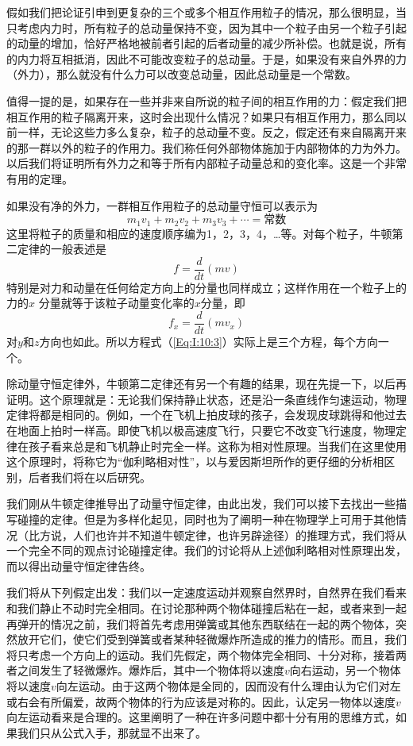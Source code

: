 假如我们把论证引申到更复杂的三个或多个相互作用粒子的情况，那么很明显，当只考虑内力时，所有粒子的总动量保持不变，因为其中一个粒子由另一个粒子引起的动量的增加，恰好严格地被前者引起的后者动量的减少所补偿。也就是说，所有的内力将互相抵消，因此不可能改变粒子的总动量。于是，如果没有来自外界的力（外力），那么就没有什么力可以改变总动量，因此总动量是一个常数。

值得一提的是，如果存在一些并非来自所说的粒子间的相互作用的力：假定我们把相互作用的粒子隔离开来，这时会出现什么情况？如果只有相互作用力，那么同以前一样，无论这些力多么复杂，粒子的总动量不变。反之，假定还有来自隔离开来的那一群以外的粒子的作用力。我们称任何外部物体施加于内部物体的力为外力。以后我们将证明所有外力之和等于所有内部粒子动量总和的变化率。这是一个非常有用的定理。

如果没有净的外力，一群相互作用粒子的总动量守恒可以表示为
\begin{equation}
    \label{Eq:I:10:3}
    m_1v_1+m_2v_2+m_3v_3+\cdots=\text{常数}
\end{equation}
这里将粒子的质量和相应的速度顺序编为1，2，3，4，…等。对每个粒子，牛顿第二定律的一般表述是
\begin{equation}
    \label{Eq:I:10:4}
    f=\frac{d}{dt}(mv)
\end{equation}
特别是对力和动量在任何给定方向上的分量也同样成立；这样作用在一个粒子上的力的$x$
分量就等于该粒子动量变化率的$x$分量，即
\begin{equation}
    \label{Eq:I:10:5}
    f_x=\frac{d}{dt}(mv_x)
\end{equation}
对$y$和$z$方向也如此。所以方程式（\ref{Eq:I:10:3}）实际上是三个方程，每个方向一个。

除动量守恒定律外，牛顿第二定律还有另一个有趣的结果，现在先提一下，以后再证明。这个原理就是：无论我们保持静止状态，还是沿一条直线作匀速运动，物理定律将都是相同的。例如，一个在飞机上拍皮球的孩子，会发现皮球跳得和他过去在地面上拍时一样高。即使飞机以极高速度飞行，只要它不改变飞行速度，物理定律在孩子看来总是和飞机静止时完全一样。这称为相对性原理。当我们在这里使用这个原理时，将称它为“伽利略相对性”，以与爱因斯坦所作的更仔细的分析相区别，后者我们将在以后研究。

我们刚从牛顿定律推导出了动量守恒定律，由此出发，我们可以接下去找出一些描写碰撞的定律。但是为多样化起见，同时也为了阐明一种在物理学上可用于其他情况（比方说，人们也许并不知道牛顿定律，也许另辟途径）的推理方式，我们将从一个完全不同的观点讨论碰撞定律。我们的讨论将从上述伽利略相对性原理出发，而以得出动量守恒定律告终。

我们将从下列假定出发：我们以一定速度运动并观察自然界时，自然界在我们看来和我们静止不动时完全相同。在讨论那种两个物体碰撞后粘在一起，或者来到一起再弹开的情况之前，我们将首先考虑用弹簧或其他东西联结在一起的两个物体，突然放开它们，使它们受到弹簧或者某种轻微爆炸所造成的推力的情形。而且，我们将只考虑一个方向上的运动。我们先假定，两个物体完全相同、十分对称，接着两者之间发生了轻微爆炸。爆炸后，其中一个物体将以速度$v$向右运动，另一个物体将以速度$v$向左运动。由于这两个物体是全同的，因而没有什么理由认为它们对左或右会有所偏爱，故两个物体的行为应该是对称的。因此，认定另一物体以速度$v$向左运动看来是合理的。这里阐明了一种在许多问题中都十分有用的思维方式，如果我们只从公式入手，那就显不出来了。

